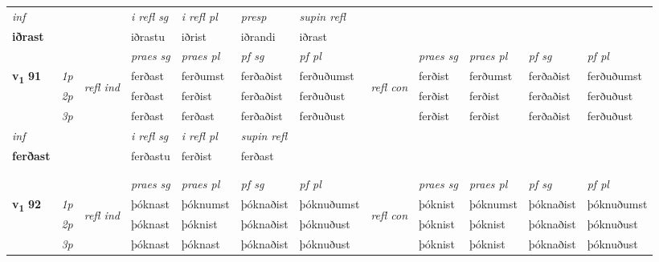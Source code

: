 \begin{longtable}[l]{X>{\footnotesize\itshape}llXXXXlXXXX}
   {\textit{inf}} & &   & \textit{i refl sg} & \textit{i refl pl} & \textit{presp}  & \textit{supin refl}  \\*
  {\textbf{iðrast}} & &   & iðrastu & iðrist & iðrandi  & iðrast  \\*

\midrule

 & &   & \textit{praes sg}  & \textit{praes pl}    & \textit{ pf sg} & \textit{pf pl} & & \textit{praes sg}  & \textit{praes pl}    & \textit{pf sg} & \textit{pf pl }  \\ \cmidrule{4-7} \cmidrule{9-12}
 \multirow{2}{*}{{{\textbf{v{\textsubscript{1}}} \Large{\textbf{91}}}}}  & 1p & \multirow{3}{*}{\begin{turn}{90}\textit{refl ind}\end{turn}}  & ferðast & ferðumst & ferðaðist & ferðuðumst & \multirow{3}{*}{\begin{turn}{90}\textit{refl con}\end{turn}}  &ferðist & ferðumst & ferðaðist & ferðuðumst \\*
 & 2p &  & ferðast & ferðist & ferðaðist & ferðuðust & &ferðist & ferðist & ferðaðist & ferðuðust \\*
 & 3p  & & ferðast & ferðast & ferðaðist & ferðuðust & & ferðist & ferðist& ferðaðist & ferðuðust \\*
\cmidrule{4-7} \cmidrule{9-12}

   {\textit{inf}} & &   & \textit{i refl sg} & \textit{i refl pl}   & \textit{supin refl}  \\*
  {\textbf{ferðast}} & &   & ferðastu & ferðist   & ferðast  \\*

\midrule
  

 
   & \\*
  & \\
   \midrule
 & &   & \textit{praes sg}  & \textit{praes pl}    & \textit{ pf sg} & \textit{pf pl} & & \textit{praes sg}  & \textit{praes pl}    & \textit{pf sg} & \textit{pf pl }  \\ \cmidrule{4-7} \cmidrule{9-12}
 \multirow{2}{*}{{{\textbf{v{\textsubscript{1}}} \Large{\textbf{92}}}}}  & 1p & \multirow{3}{*}{\begin{turn}{90}\textit{refl ind}\end{turn}}  & þóknast & þóknumst & þóknaðist & þóknuðumst & \multirow{3}{*}{\begin{turn}{90}\textit{refl con}\end{turn}}  &þóknist & þóknumst & þóknaðist & þóknuðumst \\*
 & 2p &  & þóknast & þóknist & þóknaðist & þóknuðust & &þóknist & þóknist & þóknaðist & þóknuðust \\*
 & 3p  & & þóknast & þóknast & þóknaðist & þóknuðust & & þóknist & þóknist& þóknaðist & þóknuðust \\*
\cmidrule{4-7} \cmidrule{9-12}


\end{longtable}
